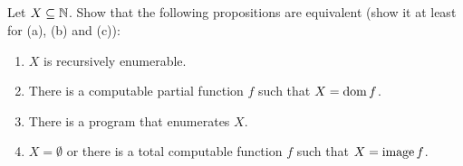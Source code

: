 \subsection{} %
Let \(X \subseteq \mathbb{N}\).
Show that the following propositions are equivalent
(show it at least for (a), (b) and (c)):
\begin{enumerate}
	\item \(X\) is recursively enumerable.
	\item There is a computable partial function \(f\)
	such that \(X = \operatorname{dom} f\).
	\item There is a \java{} program that enumerates \(X\).
	\item \(X = \emptyset\) or there is a total computable function \(f\)
	such that \(X = \operatorname{image} f\).
\end{enumerate}

